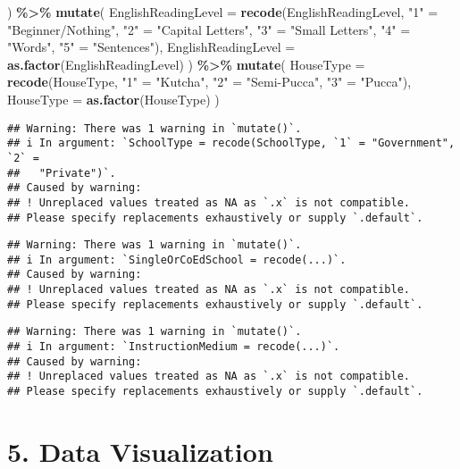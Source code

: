 \documentclass[
]{article}
\newenvironment{Shaded}{\begin{snugshade}}{\end{snugshade}}
\newcommand{\AttributeTok}[1]{\textcolor[rgb]{0.13,0.29,0.53}{#1}}
\newcommand{\FunctionTok}[1]{\textcolor[rgb]{0.13,0.29,0.53}{\textbf{#1}}}
\newcommand{\NormalTok}[1]{#1}
\newcommand{\OtherTok}[1]{\textcolor[rgb]{0.56,0.35,0.01}{#1}}
\newcommand{\SpecialCharTok}[1]{\textcolor[rgb]{0.81,0.36,0.00}{\textbf{#1}}}
\newcommand{\StringTok}[1]{\textcolor[rgb]{0.31,0.60,0.02}{#1}}
\begin{document}
\begin{Shaded}
\begin{Highlighting}[]
\NormalTok{  ) }\SpecialCharTok{\%\textgreater{}\%}
  \FunctionTok{mutate}\NormalTok{(}
    \AttributeTok{EnglishReadingLevel =} \FunctionTok{recode}\NormalTok{(EnglishReadingLevel, }\StringTok{"1"} \OtherTok{=} \StringTok{"Beginner/Nothing"}\NormalTok{, }\StringTok{"2"} \OtherTok{=} \StringTok{"Capital Letters"}\NormalTok{, }\StringTok{"3"} \OtherTok{=} \StringTok{"Small Letters"}\NormalTok{, }\StringTok{"4"} \OtherTok{=} \StringTok{"Words"}\NormalTok{, }\StringTok{"5"} \OtherTok{=} \StringTok{"Sentences"}\NormalTok{),}
    \AttributeTok{EnglishReadingLevel =} \FunctionTok{as.factor}\NormalTok{(EnglishReadingLevel)}
\NormalTok{  ) }\SpecialCharTok{\%\textgreater{}\%}
  \FunctionTok{mutate}\NormalTok{(}
    \AttributeTok{HouseType =} \FunctionTok{recode}\NormalTok{(HouseType, }\StringTok{"1"} \OtherTok{=} \StringTok{"Kutcha"}\NormalTok{, }\StringTok{"2"} \OtherTok{=} \StringTok{"Semi{-}Pucca"}\NormalTok{, }\StringTok{"3"} \OtherTok{=} \StringTok{"Pucca"}\NormalTok{),}
    \AttributeTok{HouseType =} \FunctionTok{as.factor}\NormalTok{(HouseType)}
\NormalTok{  )}
\end{Highlighting}
\end{Shaded}

\begin{verbatim}
## Warning: There was 1 warning in `mutate()`.
## i In argument: `SchoolType = recode(SchoolType, `1` = "Government", `2` =
##   "Private")`.
## Caused by warning:
## ! Unreplaced values treated as NA as `.x` is not compatible.
## Please specify replacements exhaustively or supply `.default`.
\end{verbatim}

\begin{verbatim}
## Warning: There was 1 warning in `mutate()`.
## i In argument: `SingleOrCoEdSchool = recode(...)`.
## Caused by warning:
## ! Unreplaced values treated as NA as `.x` is not compatible.
## Please specify replacements exhaustively or supply `.default`.
\end{verbatim}

\begin{verbatim}
## Warning: There was 1 warning in `mutate()`.
## i In argument: `InstructionMedium = recode(...)`.
## Caused by warning:
## ! Unreplaced values treated as NA as `.x` is not compatible.
## Please specify replacements exhaustively or supply `.default`.
\end{verbatim}

\section{5. Data Visualization}\label{data-visualization}
\end{document}

